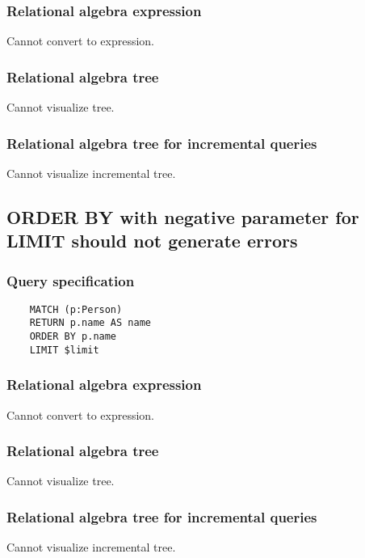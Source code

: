 	\subsubsection*{Relational algebra expression}

	Cannot convert to expression.

	\subsubsection*{Relational algebra tree}

	Cannot visualize tree.

	\subsubsection*{Relational algebra tree for incremental queries}

	Cannot visualize incremental tree.
	\subsection{ORDER BY with negative parameter for LIMIT should not generate errors}

	\subsubsection*{Query specification}

	\begin{lstlisting}
	MATCH (p:Person)
	RETURN p.name AS name
	ORDER BY p.name
	LIMIT $limit
	\end{lstlisting}


	\subsubsection*{Relational algebra expression}

	Cannot convert to expression.

	\subsubsection*{Relational algebra tree}

	Cannot visualize tree.

	\subsubsection*{Relational algebra tree for incremental queries}

	Cannot visualize incremental tree.

